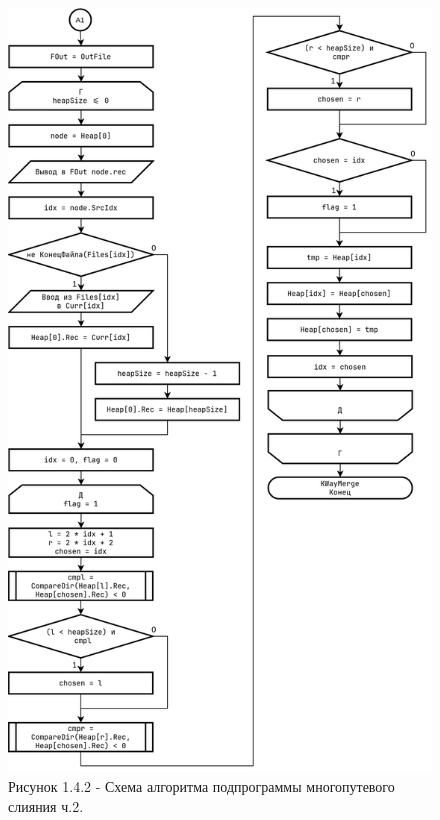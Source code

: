\documentclass[oneside,a4paper,14pt]{extarticle}
\begin{document}
\clearpage
\begin{figure}[H]
	\centering
	\includegraphics[height=0.9\textheight]{pics/flowchart4p2.png}
	\caption*{Рисунок 1.4.2 - Схема алгоритма подпрограммы многопутевого слияния ч.2.}
\end{figure}
\end{document}
